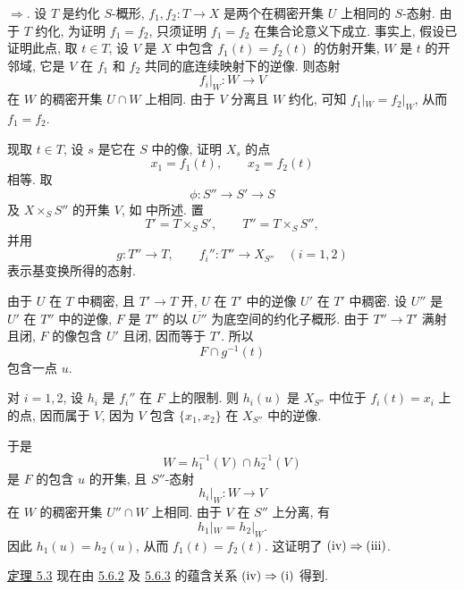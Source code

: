 \smallskip
\noindent\textup{}\(\Rightarrow\)\textup{}.
设 \(T\) 是约化 \(S\)-概形, \(f_1,f_2:T\to X\)
是两个在稠密开集 \(U\) 上相同的 \(S\)-态射.
由于 \(T\) 约化, 为证明 \(f_1=f_2\),
只须证明 \(f_1=f_2\) 在集合论意义下成立.
事实上, 假设已证明此点, 取 \(t\in T\),
设 \(V\) 是 \(X\) 中包含 \(f_1(t)=f_2(t)\) 的仿射开集,
\(W\) 是 \(t\) 的开邻域,
它是 \(V\) 在 \(f_1\) 和 \(f_2\) 共同的底连续映射下的逆像.
则态射
\[
  f_i|_W:W\longrightarrow V
\]
在 \(W\) 的稠密开集 \(U\cap W\) 上相同.
由于 \(V\) 分离且 \(W\) 约化, 可知 \(f_1|_W=f_2|_W\),
从而 \(f_1=f_2\).

现取 \(t\in T\), 设 \(s\) 是它在 \(S\) 中的像,
证明 \(X_s\) 的点
\[
  x_1=f_1(t),\qquad x_2=f_2(t)
\]
相等. 取
\[
  \phi:S''\longrightarrow S'\longrightarrow S
\]
及 \(X\times_S S''\) 的开集 \(V\),
如 \textup{} 中所述. 置
\[
  T'=T\times_S S',\qquad T''=T\times_S S'',
\]
并用
\[
  g:T''\longrightarrow T,\qquad
  f_i'':T''\longrightarrow X_{S''}\quad(i=1,2)
\]
表示基变换所得的态射.

由于 \(U\) 在 \(T\) 中稠密, 且 \(T'\to T\) 开,
\(U\) 在 \(T'\) 中的逆像 \(U'\) 在 \(T'\) 中稠密.
设 \(U''\) 是 \(U'\) 在 \(T''\) 中的逆像,
\(F\) 是 \(T''\) 的以 \(\overline{U''}\) 为底空间的约化子概形.
由于 \(T''\to T'\) 满射且闭, \(F\) 的像包含 \(U'\) 且闭,
因而等于 \(T'\). 所以
\[
  F\cap g^{-1}(t)
\]
包含一点 \(u\).

对 \(i=1,2\), 设 \(h_i\) 是 \(f_i''\) 在 \(F\) 上的限制.
则 \(h_i(u)\) 是 \(X_{S''}\) 中位于 \(f_i(t)=x_i\) 上的点,
因而属于 \(V\), 因为 \(V\) 包含 \(\{x_1,x_2\}\) 在 \(X_{S''}\) 中的逆像.

于是
\[
  W=h_1^{-1}(V)\cap h_2^{-1}(V)
\]
是 \(F\) 的包含 \(u\) 的开集, 且 \(S''\)-态射
\[
  h_i|_W:W\longrightarrow V
\]
在 \(W\) 的稠密开集 \(U''\cap W\) 上相同.
由于 \(V\) 在 \(S''\) 上分离, 有
\[
  h_1|_W=h_2|_W.
\]
因此 \(h_1(u)=h_2(u)\), 从而 \(f_1(t)=f_2(t)\).
这证明了 \(\textup{(iv)}\Rightarrow\textup{(iii)}\).

\medskip
{}\label{ded:sga3-VIB-theorem-5.3-from-5.6.2-5.6.3}%
\hyperref[thm:sga3-VIB-5.3]{定理 5.3} 现在由
\hyperref[cor:sga3-VIB-5.6.2]{5.6.2} 及
\hyperref[lem:sga3-VIB-5.6.3]{5.6.3} 的蕴含关系
\(\textup{(iv)}\Rightarrow\textup{(i)}\) 得到.

